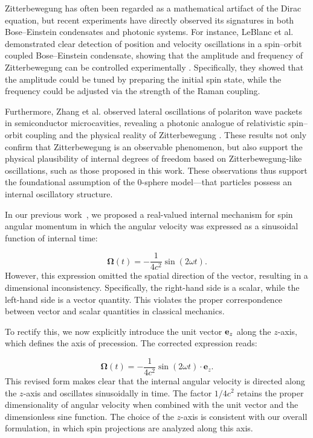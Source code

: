 \documentclass[%
 reprint,
 amsmath,amssymb,
 aps,
]{revtex4-1}
\numberwithin{equation}{section}%
\begin{document}
Zitterbewegung has often been regarded as a mathematical artifact of the Dirac equation, but recent experiments have directly observed its signatures in both Bose–Einstein condensates and photonic systems. For instance, LeBlanc et al. demonstrated clear detection of position and velocity oscillations in a spin–orbit coupled Bose–Einstein condensate, showing that the amplitude and frequency of Zitterbewegung can be controlled experimentally \cite{leblanc2013}. Specifically, they showed that the amplitude could be tuned by preparing the initial spin state, while the frequency could be adjusted via the strength of the Raman coupling.

Furthermore, Zhang et al. observed lateral oscillations of polariton wave packets in semiconductor microcavities, revealing a photonic analogue of relativistic spin–orbit coupling and the physical reality of Zitterbewegung \cite{zhang2023}. These results not only confirm that Zitterbewegung is an observable phenomenon, but also support the physical plausibility of internal degrees of freedom based on Zitterbewegung-like oscillations, such as those proposed in this work. These observations thus support the foundational assumption of the 0-sphere model—that particles possess an internal oscillatory structure.

In our previous work~\cite{hanamura2309.0047}, we proposed a real-valued internal mechanism for spin angular momentum in which the angular velocity was expressed as a sinusoidal function of internal time:

\begin{equation}
    \boldsymbol{\Omega}(t) = -\frac{1}{4c^2} \sin(2\omega t).
\end{equation}
However, this expression omitted the spatial direction of the vector, resulting in a dimensional inconsistency. Specifically, the right-hand side is a scalar, while the left-hand side is a vector quantity. This violates the proper correspondence between vector and scalar quantities in classical mechanics.

To rectify this, we now explicitly introduce the unit vector ${\bf e}_z$ along the $z$-axis, which defines the axis of precession. The corrected expression reads:

\begin{equation}
    \boldsymbol{\Omega}(t) = -\frac{1}{4c^2} \sin(2\omega t) \cdot \boldsymbol{e}_z.
\end{equation}
This revised form makes clear that the internal angular velocity is directed along the $z$-axis and oscillates sinusoidally in time. The factor $1/4c^2$ retains the proper dimensionality of angular velocity when combined with the unit vector and the dimensionless sine function. The choice of the $z$-axis is consistent with our overall formulation, in which spin projections are analyzed along this axis.
\end{document}
